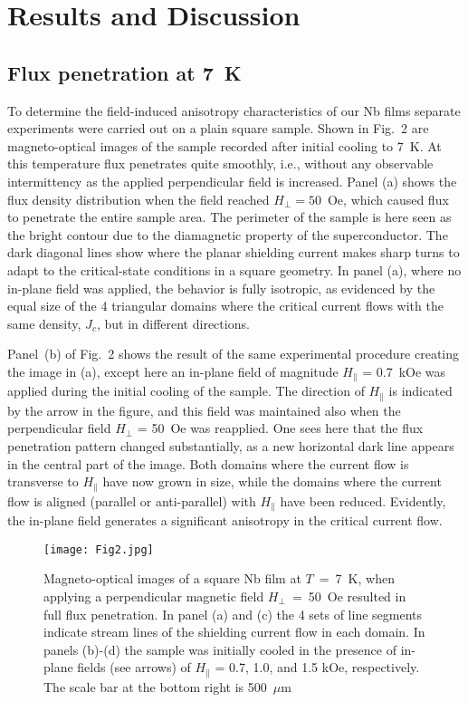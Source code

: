 \documentclass[superscriptaddress,twocolumn,aps,
showpacs]{revtex4-1}
\begin{document}
\section{Results and Discussion}
\subsection{Flux penetration at 7~K}

To determine the field-induced anisotropy characteristics of our Nb films separate experiments were carried out on a plain square sample.
Shown in Fig.~2 are magneto-optical images of the sample recorded after initial cooling to 7~K.
At this temperature flux penetrates quite smoothly, i.e., without any observable intermittency as the applied perpendicular field is increased. 
Panel (a) shows the flux density distribution when the field reached $H_{\perp} = 50$~Oe, which caused flux to penetrate the entire sample area.
The perimeter of the sample is here seen as the bright contour due to the diamagnetic property of the superconductor. 
The dark diagonal lines show where the planar shielding current makes sharp turns to adapt to the critical-state conditions in a square geometry.\cite{schuster_observation_1994}
In panel (a), where no in-plane field was applied, the behavior is fully isotropic, as evidenced by the equal size of the 4 triangular domains where the critical current flows with the same density, $J_c$, but in different directions.

Panel~(b) of Fig.~2 shows the result of the same experimental procedure creating the image in (a), except here an in-plane field of magnitude $H_{\parallel}$ = 0.7~kOe was applied during the initial cooling of the sample.
The direction of $H_{\parallel}$ is indicated by the arrow in the figure, and this field  was maintained also when the perpendicular field $H_{\perp}$ = 50~Oe  was reapplied.
One sees here that the flux penetration pattern changed substantially, as a new horizontal dark line appears in the central part of the image.
Both domains where the current flow is transverse to $H_{\parallel}$ have now grown in size, while  the domains where the current flow is aligned (parallel  or anti-parallel) with $H_{\parallel}$ have been reduced.
Evidently, the in-plane field generates a significant anisotropy in the critical current flow.\cite{vlasko-vlasov_crossing_2016}

\begin{figure}[t]
  \centering
  \texttt{[image: Fig2.jpg]}
  \label{fig:square7K}
  \caption{Magneto-optical images of a square Nb film at $T$~=~7~K, when applying a perpendicular magnetic field $H_{\perp}$~=~50~Oe resulted in full flux penetration. In panel (a) and (c) the 4 sets of line segments indicate stream lines of the shielding current flow in each domain. 
In panels (b)-(d) the sample was initially cooled in the presence of in-plane fields (see arrows) of  $H_{\parallel}$ = 0.7,  1.0, and 1.5 kOe, respectively. The scale bar at the bottom right is 500~$\mu$m}
 \end{figure}
\end{document}
